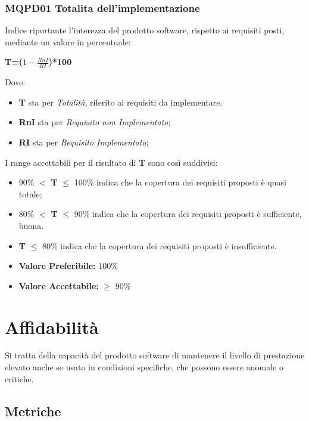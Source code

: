 \subsubsection{MQPD01 Totalita dell’implementazione} \label{3.1.1.1}
Indice riportante l’interezza del prodotto software, rispetto ai requisiti posti, mediante un valore in percentuale:
\begin{center}
	\textbf{T=($1-\frac{RnI}{RI}$)*100}
\end{center}
Dove:
\begin{itemize}
	\item \textbf{T} sta per \textit{Totalità}, riferito ai requisiti da implementare.
	\item \textbf{RnI} sta per \textit{Requisito non Implementato};
	\item \textbf{RI} sta per \textit{Requisito Implementato};
\end{itemize}
I range accettabili per il risultato di \textbf{T} sono così suddivisi:
\begin{itemize}
	\item 90\% $<$ \textbf{T} $\leq$ 100\% indica che la copertura dei requisiti proposti è quasi totale;
	\item 80\% $<$ \textbf{T} $\leq$ 90\% indica che la copertura dei requisiti proposti è sufficiente, buona.
	\item \textbf{T} $\leq$ 80\% indica che la copertura dei requisiti proposti è insufficiente.
\end{itemize}
\begin{itemize}
	\item \textbf{Valore Preferibile:} 100\% 
	\item \textbf{Valore  Accettabile:} $\geq$ 90\% 
\end{itemize}

\section{Affidabilità} \label{3.2}
Si tratta della capacità del prodotto software di mantenere il livello di prestazione elevato anche se usato in condizioni specifiche, che possono essere anomale o critiche. 
\subsection{Metriche} \label{3.2.1}
